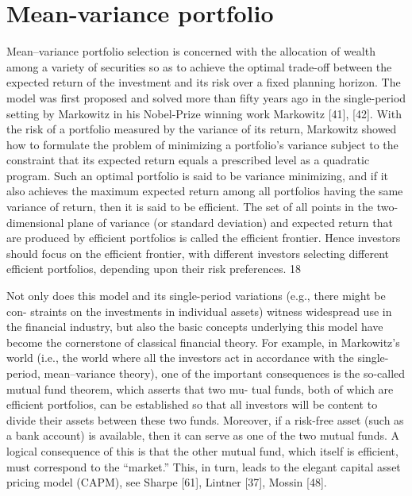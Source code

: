 \chapter{Mean-variance portfolio}
Mean–variance portfolio selection is concerned with the allocation of wealth among a variety of securities so as to achieve the optimal trade-off between the expected return of the investment and its risk over a fixed planning horizon. The model was first proposed and solved more than fifty years ago in the single-period setting by Markowitz in his Nobel-Prize winning work Markowitz [41], [42]. With the risk of a portfolio measured by the variance of its return, Markowitz showed how to formulate the problem of minimizing a portfolio’s variance subject to the constraint that its expected return equals a prescribed level as a quadratic program. Such an optimal portfolio is said to be variance minimizing, and if it also achieves the maximum expected return among all portfolios having the same variance of return, then it is said to be efficient. The set of all points in the two-dimensional plane of variance (or standard deviation) and expected return that are produced by efficient portfolios is called the efficient frontier. Hence investors should focus on the efficient frontier, with different investors selecting different efficient portfolios, depending upon their risk preferences.
18

Not only does this model and its single-period variations (e.g., there might be con- straints on the investments in individual assets) witness widespread use in the financial industry, but also the basic concepts underlying this model have become the cornerstone of classical financial theory. For example, in Markowitz’s world (i.e., the world where all the investors act in accordance with the single-period, mean–variance theory), one of the important consequences is the so-called mutual fund theorem, which asserts that two mu- tual funds, both of which are efficient portfolios, can be established so that all investors will be content to divide their assets between these two funds. Moreover, if a risk-free asset (such as a bank account) is available, then it can serve as one of the two mutual funds. A logical consequence of this is that the other mutual fund, which itself is efficient, must correspond to the “market.” This, in turn, leads to the elegant capital asset pricing model (CAPM), see Sharpe [61], Lintner [37], Mossin [48].

